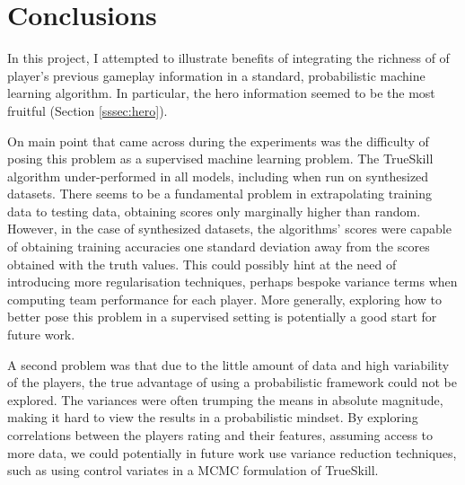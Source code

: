 \documentclass[10pt,a4]{article}
\begin{document}
\section{Conclusions}

In this project, I attempted to illustrate benefits of integrating the richness of 
of player's previous gameplay information in a standard, probabilistic machine learning 
algorithm. In particular, the hero information seemed to be the most fruitful (Section \ref{sssec:hero}).

On main point that came across during the experiments was the difficulty of posing
this problem as a supervised machine learning problem. The TrueSkill algorithm 
under-performed in all models, including when run on synthesized datasets. There
seems to be a fundamental problem in extrapolating training data to testing data, 
obtaining scores only marginally higher than random. However, in the case of 
synthesized datasets, the algorithms' scores were capable of obtaining training accuracies 
one standard deviation away from the scores obtained with the truth values. 
This could possibly hint at the need of introducing more regularisation techniques,
perhaps bespoke variance terms when computing team performance for each player.
More generally, exploring how to better pose this problem in a supervised 
setting is potentially a good start for future work.

A second problem was that due to the little amount of data and high variability of 
the players, the true advantage of using a probabilistic framework could not be 
explored. The variances were often trumping the means in absolute magnitude, making
it hard to view the results in a probabilistic mindset. By exploring correlations 
between the players rating and their features, assuming access to more data, we could 
potentially in future work use variance reduction techniques, such as using 
control variates in a MCMC formulation of TrueSkill.















































 
\newpage

\end{document}
